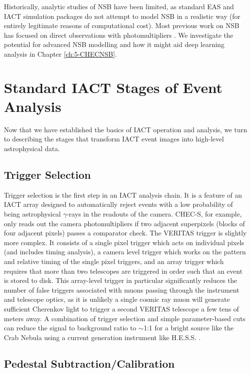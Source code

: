 Historically, analytic studies of NSB have been limited, as standard EAS and IACT simulation packages do not attempt to model NSB in a realistic way (for entirely legitimate reasons of computational cost). Most previous work on NSB has focused on direct observations with photomultipliers \cite{BandE}. We investigate the potential for advanced NSB modelling and how it might aid deep learning analysis in Chapter \ref{ch:5-CHECNSB}.

\section{Standard IACT Stages of Event Analysis}\label{app:imaging}
Now that we have established the basics of IACT operation and analysis, we turn to describing the stages that transform IACT event images into high-level astrophysical data.
\subsection{Trigger Selection}

Trigger selection is the first step in an IACT analysis chain. It is a feature of an IACT array designed to automatically reject events with a low probability of being astrophysical $\gamma$-rays in the readouts of the camera. CHEC-S, for example, only reads out the camera photomultipliers if two adjacent superpixels (blocks of four adjacent pixels) passes a comparator check. The VERITAS trigger is slightly more complex. It consists of a single pixel trigger which acts on individual pixels (and includes timing analysis), a camera level trigger which works on the pattern and relative timing of the single pixel triggers, and an array trigger which requires that more than two telescopes are triggered in order such that an event is stored to disk\cite{veritastrigger}. This array-level trigger in particular significantly reduces the number of false triggers associated with muons passing through the instrument and telescope optics, as it is unlikely a single cosmic ray muon will generate sufficient Cherenkov light to trigger a second VERITAS telescope a few tens of meters away. A combination of trigger selection and simple parameter-based cuts can reduce the signal to background ratio to $\sim$1:1 for a bright source like the Crab Nebula using a current generation instrument like H.E.S.S. \cite{Berge07}.

\subsection{Pedestal Subtraction/Calibration}

